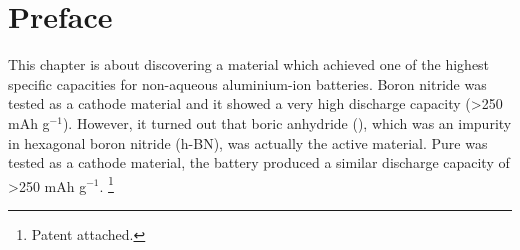 \section*{Preface}
This chapter is about discovering a material which achieved one of the highest specific capacities for non-aqueous aluminium-ion batteries. Boron nitride was tested as a cathode material and it showed a very high discharge capacity (>250 mAh g$^{-1}$). However, it turned out that boric anhydride (), which was an impurity in hexagonal boron nitride (h-BN), was actually the active material. Pure  was tested as a cathode material, the battery produced a similar discharge capacity of >250 mAh g$^{-1}$. 
\footnote{Patent attached.}  
